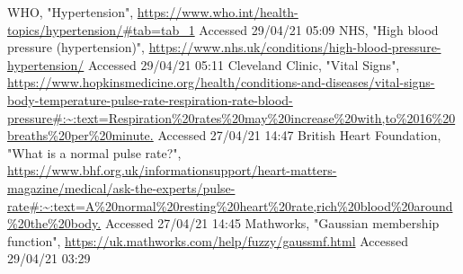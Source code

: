 \documentclass[11pt]{article}
\numberwithin{equation}{section}
\begin{document}
\begin{thebibliography}{00}
     WHO, "Hypertension", \url{https://www.who.int/health-topics/hypertension/#tab=tab_1} Accessed 29/04/21 05:09
     NHS, "High blood pressure (hypertension)", \url{https://www.nhs.uk/conditions/high-blood-pressure-hypertension/} Accessed 29/04/21 05:11
     Cleveland Clinic, "Vital Signs", \url{https://www.hopkinsmedicine.org/health/conditions-and-diseases/vital-signs-body-temperature-pulse-rate-respiration-rate-blood-pressure#:~:text=Respiration%20rates%20may%20increase%20with,to%2016%20breaths%20per%20minute.} Accessed 27/04/21 14:47
     British Heart Foundation, "What is a normal pulse rate?", \url{https://www.bhf.org.uk/informationsupport/heart-matters-magazine/medical/ask-the-experts/pulse-rate#:~:text=A%20normal%20resting%20heart%20rate,rich%20blood%20around%20the%20body.} Accessed 27/04/21 14:45
     Mathworks, "Gaussian membership function", \url{https://uk.mathworks.com/help/fuzzy/gaussmf.html} Accessed 29/04/21 03:29
\end{thebibliography}
\end{document}
